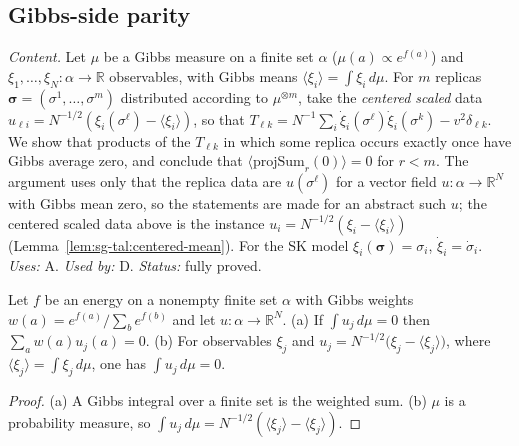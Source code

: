 \subsection{Gibbs-side parity}
\label{sec:sg-tal:fluct-gibbs}

\emph{Content.}  Let $\mu$ be a Gibbs measure on a finite set $\alpha$ ($\mu(a)\propto e^{f(a)}$) and $\xi_1,\dots,\xi_N:\alpha\to\mathbb R$ observables, with Gibbs means
$\langle\xi_i\rangle=\int\xi_i\,d\mu$.  For $m$ replicas $\boldsymbol\sigma=(\sigma^1,\dots,\sigma^m)$ distributed according to $\mu^{\otimes m}$, take the \emph{centered scaled} data
$u_{\ell i}=N^{-1/2}(\xi_i(\sigma^\ell)-\langle\xi_i\rangle)$, so that $T_{\ell k}=N^{-1}\sum_i\dot\xi_i(\sigma^\ell)\dot\xi_i(\sigma^k)-v^2\delta_{\ell k}$.
We show that products of the $T_{\ell k}$ in which some replica occurs exactly once have Gibbs average zero, and conclude that $\langle\mathrm{projSum}_r(0)\rangle=0$ for $r<m$.
The argument uses only that the replica data are $u(\sigma^\ell)$ for a vector field $u:\alpha\to\mathbb R^N$ with Gibbs mean zero, so the statements are made for an abstract such $u$; the centered scaled data above is the instance $u_i=N^{-1/2}(\xi_i-\langle\xi_i\rangle)$ (Lemma~\ref{lem:sg-tal:centered-mean}).
For the SK model $\xi_i(\boldsymbol\sigma)=\sigma_i$, $\dot\xi_i=\dot\sigma_i$.
\emph{Uses:} A.  \emph{Used by:} D.  \emph{Status:} fully proved.

\begin{lemma}
\label{lem:sg-tal:centered-mean}
  \leanok
{}
Let $f$ be an energy on a nonempty finite set $\alpha$ with Gibbs weights $w(a)=e^{f(a)}/\sum_be^{f(b)}$ and let $u:\alpha\to\mathbb R^N$.  (a) If $\int u_j\,d\mu=0$ then $\sum_aw(a)u_j(a)=0$.
(b) For observables $\xi_j$ and $u_j=N^{-1/2}\bigl(\xi_j-\langle\xi_j\rangle\bigr)$, where $\langle\xi_j\rangle=\int\xi_j\,d\mu$, one has $\int u_j\,d\mu=0$.
\end{lemma}
\begin{proof}
  \leanok
(a) A Gibbs integral over a finite set is the weighted sum.  (b) $\mu$ is a probability measure, so $\int u_j\,d\mu=N^{-1/2}(\langle\xi_j\rangle-\langle\xi_j\rangle)$.
\end{proof}

